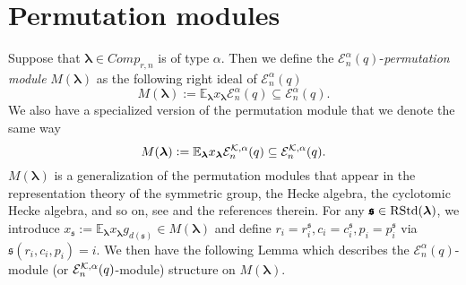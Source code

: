 \documentclass[10pt,a4,twoside,hidelinks,rm]{article}
\newcommand{\Bs}{\pmb{\mathfrak{s}}}
\newcommand{\MC}{{ {Comp}}_{r,n}}
\newcommand{\rstd}{{\rm RStd}}
\newcommand{\Ea}{ {\mathcal E}_n^{\alpha}(q)}
\newcommand{\Eak}{ {\mathcal E}_n^{ {\cal K}, \alpha}(q)}
\newcommand\blambda{{\boldsymbol\lambda}}
\newcommand\be{\mathbb{E}}
\theoremstyle{plain}
\begin{document}
\section{Permutation modules} 
Suppose that $ \blambda \in \MC$ is of type $ \alpha$. Then 
we define the $\Ea$-\textit{permutation module }$ M(\blambda) $ as the following right
ideal of $\Ea$
\begin{equation}
M(\blambda) :=   \be_{\blambda} x_{\blambda} \Ea  \subseteq \Ea.
\end{equation}
We also have a specialized version of the permutation module that we denote the same way
\begin{equation}
M(\blambda) :=   \be_{\blambda} x_{\blambda} \Eak  \subseteq \Eak.
\end{equation}
$ M(\blambda) $ 
is a generalization of the permutation modules that appear in the representation theory
of the symmetric group, the Hecke algebra, the cyclotomic Hecke algebra, and so on, see 
\cite{DJM} and the references therein.
For any $ \Bs \in \rstd(\blambda)$, we introduce
$ x_{\Bs }:=   { \be}^{}_{\blambda} x^{}_{\blambda} g^{}_{d(\Bs)} \in M(\blambda)$
and define $ r_i =r_{i}^{\Bs}, c_i = c_i ^{{\Bs}},p_i= p_i^{\Bs} $ via
$ \Bs(r_i, c_i, p_i) =  i $.
We then have the following Lemma which describes the $ \Ea$-module (or $ \Eak$-module) structure on 
$ M(\blambda)  $.
\end{document}
